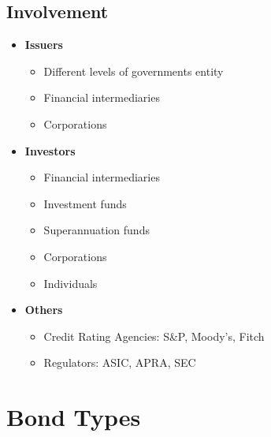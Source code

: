 \documentclass[
]{book}
\providecommand{\tightlist}{%
  \setlength{\itemsep}{0pt}\setlength{\parskip}{0pt}}
\begin{document}
\hypertarget{involvement}{%
\subsection{Involvement}\label{involvement}}

\begin{itemize}
\tightlist
\item
  \textbf{Issuers}

  \begin{itemize}
  \tightlist
  \item
    Different levels of governments entity
  \item
    Financial intermediaries
  \item
    Corporations
  \end{itemize}
\item
  \textbf{Investors}

  \begin{itemize}
  \tightlist
  \item
    Financial intermediaries
  \item
    Investment funds
  \item
    Superannuation funds
  \item
    Corporations
  \item
    Individuals
  \end{itemize}
\item
  \textbf{Others}

  \begin{itemize}
  \tightlist
  \item
    Credit Rating Agencies: S\&P, Moody's, Fitch
  \item
    Regulators: ASIC, APRA, SEC
  \end{itemize}
\end{itemize}

\hypertarget{bond-types}{%
\section{Bond Types}\label{bond-types}}
\end{document}
